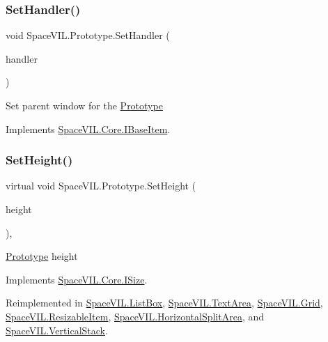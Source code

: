 \subsubsection{\texorpdfstring{Set\+Handler()}{SetHandler()}}
{\footnotesize\ttfamily void Space\+V\+I\+L.\+Prototype.\+Set\+Handler (\begin{DoxyParamCaption}\item[{\mbox{\hyperlink{class_space_v_i_l_1_1_window_layout}{Window\+Layout}}}]{handler }\end{DoxyParamCaption})\hspace{0.3cm}{\ttfamily [inline]}}



Set parent window for the \mbox{\hyperlink{class_space_v_i_l_1_1_prototype}{Prototype}} 



Implements \mbox{\hyperlink{interface_space_v_i_l_1_1_core_1_1_i_base_item}{Space\+V\+I\+L.\+Core.\+I\+Base\+Item}}.

\mbox{\label{class_space_v_i_l_1_1_prototype_adc0adcbd1c3800d9525798ba7be5832a}} 
\subsubsection{\texorpdfstring{Set\+Height()}{SetHeight()}}
{\footnotesize\ttfamily virtual void Space\+V\+I\+L.\+Prototype.\+Set\+Height (\begin{DoxyParamCaption}\item[{int}]{height }\end{DoxyParamCaption})\hspace{0.3cm}{\ttfamily [inline]}, {\ttfamily [virtual]}}



\mbox{\hyperlink{class_space_v_i_l_1_1_prototype}{Prototype}} height 



Implements \mbox{\hyperlink{interface_space_v_i_l_1_1_core_1_1_i_size}{Space\+V\+I\+L.\+Core.\+I\+Size}}.



Reimplemented in \mbox{\hyperlink{class_space_v_i_l_1_1_list_box_a5b44bd011e83b56053b529cf55253296}{Space\+V\+I\+L.\+List\+Box}}, \mbox{\hyperlink{class_space_v_i_l_1_1_text_area_abb58c3f9396680f5d2c7f238c0d6e0bb}{Space\+V\+I\+L.\+Text\+Area}}, \mbox{\hyperlink{class_space_v_i_l_1_1_grid_a64c7b1987fb8823330dbeaea7420369c}{Space\+V\+I\+L.\+Grid}}, \mbox{\hyperlink{class_space_v_i_l_1_1_resizable_item_a9ffdafec963a452576589d3efc452356}{Space\+V\+I\+L.\+Resizable\+Item}}, \mbox{\hyperlink{class_space_v_i_l_1_1_horizontal_split_area_ab018f220de9d5f76f52d3068925d1bdf}{Space\+V\+I\+L.\+Horizontal\+Split\+Area}}, and \mbox{\hyperlink{class_space_v_i_l_1_1_vertical_stack_a1e2360b005a6fb8e503dc60d27f1f021}{Space\+V\+I\+L.\+Vertical\+Stack}}.

